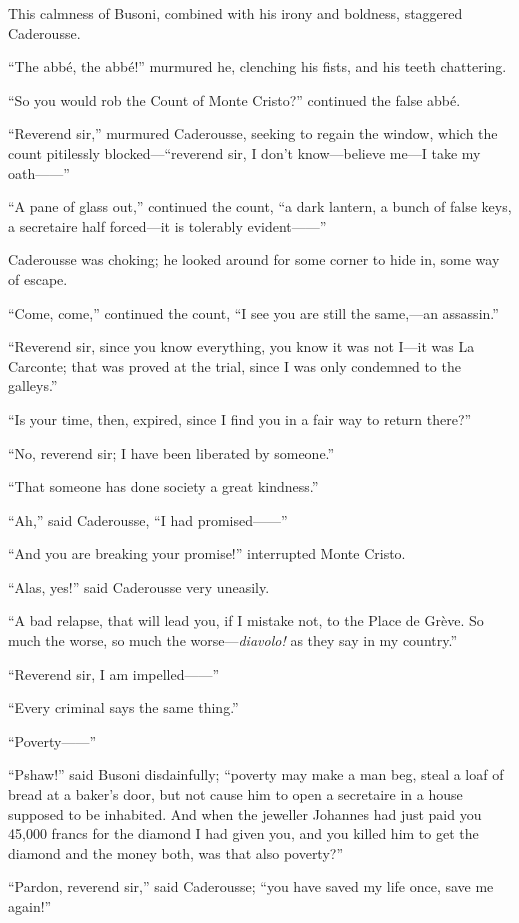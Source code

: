 This calmness of Busoni, combined with his irony and boldness,
staggered Caderousse.

“The abbé, the abbé!” murmured he, clenching his fists, and his teeth
chattering.

“So you would rob the Count of Monte Cristo?” continued the false abbé.

“Reverend sir,” murmured Caderousse, seeking to regain the window,
which the count pitilessly blocked—“reverend sir, I don’t know—believe
me—I take my oath——”

“A pane of glass out,” continued the count, “a dark lantern, a bunch of
false keys, a secretaire half forced—it is tolerably evident——”

Caderousse was choking; he looked around for some corner to hide in,
some way of escape.

“Come, come,” continued the count, “I see you are still the same,—an
assassin.”

“Reverend sir, since you know everything, you know it was not I—it was
La Carconte; that was proved at the trial, since I was only condemned
to the galleys.”

“Is your time, then, expired, since I find you in a fair way to return
there?”

“No, reverend sir; I have been liberated by someone.”

“That someone has done society a great kindness.”

“Ah,” said Caderousse, “I had promised——”

“And you are breaking your promise!” interrupted Monte Cristo.

“Alas, yes!” said Caderousse very uneasily.

“A bad relapse, that will lead you, if I mistake not, to the Place de
Grève. So much the worse, so much the worse—\textit{diavolo!} as they say in
my country.”

“Reverend sir, I am impelled——”

“Every criminal says the same thing.”

“Poverty——”

“Pshaw!” said Busoni disdainfully; “poverty may make a man beg, steal a
loaf of bread at a baker’s door, but not cause him to open a secretaire
in a house supposed to be inhabited. And when the jeweller Johannes had
just paid you 45,000 francs for the diamond I had given you, and you
killed him to get the diamond and the money both, was that also
poverty?”

“Pardon, reverend sir,” said Caderousse; “you have saved my life once,
save me again!”

